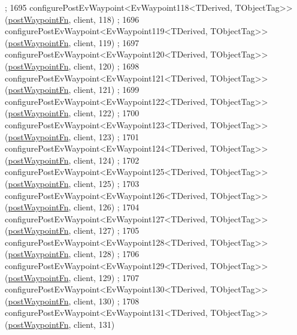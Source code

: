 \begin{DoxyCode}
      ;
1695     configurePostEvWaypoint<EvWaypoint118<TDerived, TObjectTag>>(\hyperlink{classsmacc_1_1WaypointEventDispatcher_a6bccf6a93a827634b7b5e67ac0e4ec57}{postWaypointFn}, client, 118)
      ;
1696     configurePostEvWaypoint<EvWaypoint119<TDerived, TObjectTag>>(\hyperlink{classsmacc_1_1WaypointEventDispatcher_a6bccf6a93a827634b7b5e67ac0e4ec57}{postWaypointFn}, client, 119)
      ;
1697     configurePostEvWaypoint<EvWaypoint120<TDerived, TObjectTag>>(\hyperlink{classsmacc_1_1WaypointEventDispatcher_a6bccf6a93a827634b7b5e67ac0e4ec57}{postWaypointFn}, client, 120)
      ;
1698     configurePostEvWaypoint<EvWaypoint121<TDerived, TObjectTag>>(\hyperlink{classsmacc_1_1WaypointEventDispatcher_a6bccf6a93a827634b7b5e67ac0e4ec57}{postWaypointFn}, client, 121)
      ;
1699     configurePostEvWaypoint<EvWaypoint122<TDerived, TObjectTag>>(\hyperlink{classsmacc_1_1WaypointEventDispatcher_a6bccf6a93a827634b7b5e67ac0e4ec57}{postWaypointFn}, client, 122)
      ;
1700     configurePostEvWaypoint<EvWaypoint123<TDerived, TObjectTag>>(\hyperlink{classsmacc_1_1WaypointEventDispatcher_a6bccf6a93a827634b7b5e67ac0e4ec57}{postWaypointFn}, client, 123)
      ;
1701     configurePostEvWaypoint<EvWaypoint124<TDerived, TObjectTag>>(\hyperlink{classsmacc_1_1WaypointEventDispatcher_a6bccf6a93a827634b7b5e67ac0e4ec57}{postWaypointFn}, client, 124)
      ;
1702     configurePostEvWaypoint<EvWaypoint125<TDerived, TObjectTag>>(\hyperlink{classsmacc_1_1WaypointEventDispatcher_a6bccf6a93a827634b7b5e67ac0e4ec57}{postWaypointFn}, client, 125)
      ;
1703     configurePostEvWaypoint<EvWaypoint126<TDerived, TObjectTag>>(\hyperlink{classsmacc_1_1WaypointEventDispatcher_a6bccf6a93a827634b7b5e67ac0e4ec57}{postWaypointFn}, client, 126)
      ;
1704     configurePostEvWaypoint<EvWaypoint127<TDerived, TObjectTag>>(\hyperlink{classsmacc_1_1WaypointEventDispatcher_a6bccf6a93a827634b7b5e67ac0e4ec57}{postWaypointFn}, client, 127)
      ;
1705     configurePostEvWaypoint<EvWaypoint128<TDerived, TObjectTag>>(\hyperlink{classsmacc_1_1WaypointEventDispatcher_a6bccf6a93a827634b7b5e67ac0e4ec57}{postWaypointFn}, client, 128)
      ;
1706     configurePostEvWaypoint<EvWaypoint129<TDerived, TObjectTag>>(\hyperlink{classsmacc_1_1WaypointEventDispatcher_a6bccf6a93a827634b7b5e67ac0e4ec57}{postWaypointFn}, client, 129)
      ;
1707     configurePostEvWaypoint<EvWaypoint130<TDerived, TObjectTag>>(\hyperlink{classsmacc_1_1WaypointEventDispatcher_a6bccf6a93a827634b7b5e67ac0e4ec57}{postWaypointFn}, client, 130)
      ;
1708     configurePostEvWaypoint<EvWaypoint131<TDerived, TObjectTag>>(\hyperlink{classsmacc_1_1WaypointEventDispatcher_a6bccf6a93a827634b7b5e67ac0e4ec57}{postWaypointFn}, client, 131)

\end{DoxyCode}

